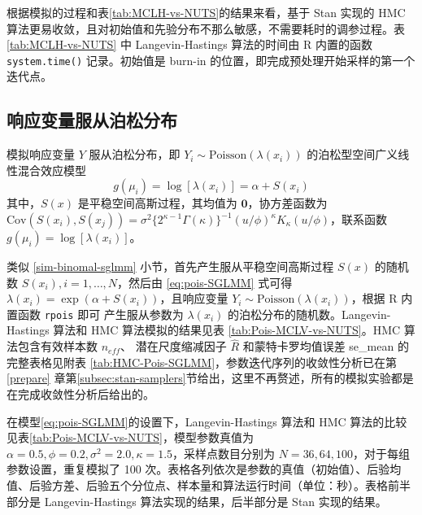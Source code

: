 \documentclass[12pt,a4paper,UTF8,twoside]{book}
\theoremstyle{definition}
\theoremstyle{definition}
\theoremstyle{definition}
\theoremstyle{remark}
\begin{document}
根据模拟的过程和表\ref{tab:MCLH-vs-NUTS}的结果来看，基于 Stan 实现的 HMC 算法更易收敛，且对初始值和先验分布不那么敏感，不需要耗时的调参过程。表 \ref{tab:MCLH-vs-NUTS} 中 Langevin-Hastings 算法的时间由 R 内置的函数 \texttt{system.time()} 记录。初始值是 burn-in 的位置，即完成预处理开始采样的第一个迭代点。

\hypertarget{possion-sglmm}{%
\subsection{响应变量服从泊松分布}\label{possion-sglmm}}

模拟响应变量 \(Y\) 服从泊松分布，即 \(Y_i \sim \mathrm{Poisson}(\lambda(x_{i}))\) 的泊松型空间广义线性混合效应模型
\begin{equation}
g(\mu_i) = \log[\lambda(x_i)] = \alpha + S(x_i) \label{eq:pois-SGLMM}
\end{equation}
\noindent 其中，\(S(x)\) 是平稳空间高斯过程，其均值为 \(\mathbf{0}\)，协方差函数为 \(\mathrm{Cov}(S(x_i),S(x_j)) = \sigma^2 \big\{2^{\kappa-1}\Gamma(\kappa)\big\}^{-1}(u/\phi)^{\kappa}K_{\kappa}(u/\phi)\)，联系函数 \(g(\mu_i) = \log[\lambda(x_{i})]\)。

类似 \ref{sim-binomal-sglmm} 小节，首先产生服从平稳空间高斯过程 \(S(x)\) 的随机数 \(S(x_i),i=1,\ldots,N\)，然后由 \eqref{eq:pois-SGLMM} 式可得 \(\lambda(x_i) = \exp(\alpha + S(x_i))\)，且响应变量 \(Y_i \sim \mathrm{Poisson}(\lambda(x_{i}))\)，根据 R 内置函数 \texttt{rpois} 即可 产生服从参数为 \(\lambda(x_i)\) 的泊松分布的随机数。Langevin-Hastings 算法和 HMC 算法模拟的结果见表 \ref{tab:Pois-MCLV-vs-NUTS}。HMC 算法包含有效样本数 \(n_{eff}\)、 潜在尺度缩减因子 \(\hat{R}\) 和蒙特卡罗均值误差 se\_mean 的完整表格见附表 \ref{tab:HMC-Pois-SGLMM}，参数迭代序列的收敛性分析已在第\ref{prepare} 章第\ref{subsec:stan-samplers}节给出，这里不再赘述，所有的模拟实验都是在完成收敛性分析后给出的。

在模型\eqref{eq:pois-SGLMM}的设置下，Langevin-Hastings 算法和 HMC 算法的比较见表\ref{tab:Pois-MCLV-vs-NUTS}，模型参数真值为 \(\alpha = 0.5, \phi = 0.2, \sigma^2 = 2.0, \kappa = 1.5\)，采样点数目分别为 \(N=36,64,100\)，对于每组参数设置，重复模拟了 100 次。表格各列依次是参数的真值（初始值）、后验均值、后验方差、后验五个分位点、样本量和算法运行时间（单位：秒）。表格前半部分是 Langevin-Hastings 算法实现的结果，后半部分是 Stan 实现的结果。
\end{document}
